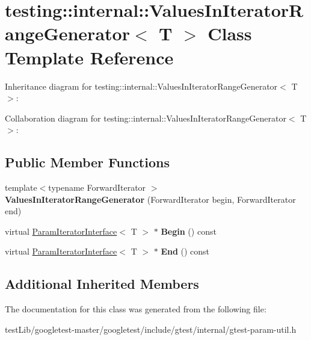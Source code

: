 \hypertarget{classtesting_1_1internal_1_1ValuesInIteratorRangeGenerator}{}\section{testing\+:\+:internal\+:\+:Values\+In\+Iterator\+Range\+Generator$<$ T $>$ Class Template Reference}
\label{classtesting_1_1internal_1_1ValuesInIteratorRangeGenerator}


Inheritance diagram for testing\+:\+:internal\+:\+:Values\+In\+Iterator\+Range\+Generator$<$ T $>$\+:


Collaboration diagram for testing\+:\+:internal\+:\+:Values\+In\+Iterator\+Range\+Generator$<$ T $>$\+:
\subsection*{Public Member Functions}
\begin{DoxyCompactItemize}
\item 
\mbox{\label{classtesting_1_1internal_1_1ValuesInIteratorRangeGenerator_a8b30f6028bc5739bbd7c24b0f0e409f7}} 
{\footnotesize template$<$typename Forward\+Iterator $>$ }\\{\bfseries Values\+In\+Iterator\+Range\+Generator} (Forward\+Iterator begin, Forward\+Iterator end)
\item 
\mbox{\label{classtesting_1_1internal_1_1ValuesInIteratorRangeGenerator_a91dac42f069cd06d05348fe5dd78639b}} 
virtual \hyperlink{classtesting_1_1internal_1_1ParamIteratorInterface}{Param\+Iterator\+Interface}$<$ T $>$ $\ast$ {\bfseries Begin} () const
\item 
\mbox{\label{classtesting_1_1internal_1_1ValuesInIteratorRangeGenerator_a4af95b9eccfc86c40a715df2d9d0df40}} 
virtual \hyperlink{classtesting_1_1internal_1_1ParamIteratorInterface}{Param\+Iterator\+Interface}$<$ T $>$ $\ast$ {\bfseries End} () const
\end{DoxyCompactItemize}
\subsection*{Additional Inherited Members}


The documentation for this class was generated from the following file\+:\begin{DoxyCompactItemize}
\item 
test\+Lib/googletest-\/master/googletest/include/gtest/internal/gtest-\/param-\/util.\+h\end{DoxyCompactItemize}
